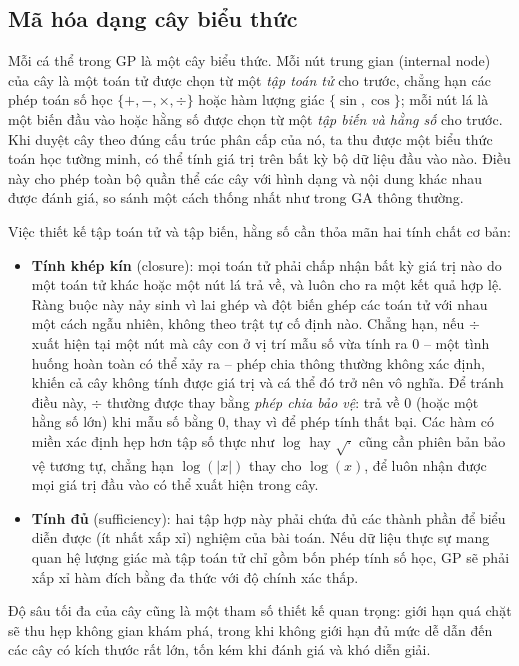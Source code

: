 \subsection*{Mã hóa dạng cây biểu thức}

Mỗi cá thể trong GP là một cây biểu thức. Mỗi nút trung gian
(internal node) của cây là một toán tử được chọn từ một \textit{tập
toán tử} cho trước, chẳng hạn các
phép toán số học $\{+,-,\times,\div\}$ hoặc hàm lượng giác
$\{\sin,\cos\}$; mỗi nút lá là một biến đầu vào hoặc hằng số được chọn
từ một \textit{tập biến và hằng số} cho trước. Khi duyệt cây theo đúng
cấu trúc phân cấp của nó, ta thu được một biểu thức toán học tường
minh, có thể tính giá trị trên bất kỳ bộ dữ liệu đầu vào nào. Điều này
cho phép toàn bộ quần thể các cây với hình dạng và nội dung khác nhau
được đánh giá, so sánh một cách thống nhất như trong GA thông thường.

Việc thiết kế tập toán tử và tập biến, hằng số cần thỏa mãn hai tính
chất cơ bản:
\begin{itemize}
    \item \textbf{Tính khép kín} (closure): mọi toán tử phải chấp
    nhận bất kỳ giá trị nào do một toán tử khác hoặc một nút lá trả
    về, và luôn cho ra một kết quả hợp lệ. Ràng buộc này nảy sinh vì
    lai ghép và đột biến ghép các toán tử với nhau một cách ngẫu
    nhiên, không theo trật tự cố định nào. Chẳng hạn, nếu $\div$ xuất
    hiện tại một nút mà cây con ở vị trí mẫu số vừa tính ra $0$ --
    một tình huống hoàn toàn có thể xảy ra -- phép chia thông thường
    không xác định, khiến cả cây không tính được giá trị và cá thể
    đó trở nên vô nghĩa. Để tránh điều này, $\div$ thường được thay
    bằng \textit{phép chia bảo vệ}: trả về $0$ (hoặc một hằng số
    lớn) khi mẫu số bằng $0$, thay vì để phép tính thất bại. Các hàm
    có miền xác định hẹp hơn tập số thực như $\log$ hay $\sqrt{\cdot}$
    cũng cần phiên bản bảo vệ tương tự, chẳng hạn $\log(|x|)$ thay
    cho $\log(x)$, để luôn nhận được mọi giá trị đầu vào có thể xuất
    hiện trong cây.
    \item \textbf{Tính đủ} (sufficiency): hai tập hợp này phải chứa
    đủ các thành phần để biểu diễn được (ít nhất xấp xỉ) nghiệm của
    bài toán. Nếu dữ liệu thực sự mang quan hệ lượng giác mà tập toán
    tử chỉ gồm bốn phép tính số học, GP sẽ phải xấp xỉ hàm đích bằng
    đa thức với độ chính xác thấp.
\end{itemize}

Độ sâu tối đa của cây cũng là một tham số thiết kế quan trọng: giới hạn
quá chặt sẽ thu hẹp không gian khám phá, trong khi không giới hạn đủ
mức dễ dẫn đến các cây có kích thước rất lớn, tốn kém khi đánh giá và
khó diễn giải.

